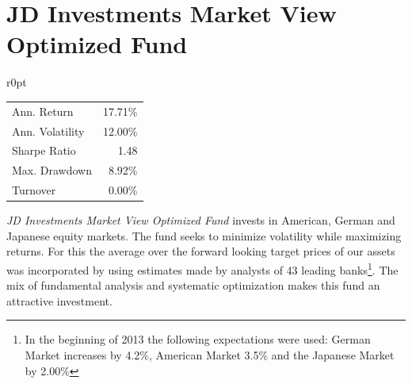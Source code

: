 \documentclass[11pt, parskip=full, DIV=14, headings=small, footsepline, footinclude=false, headsepline]{scrreprt}
\let\oldcenter\center
\let\oldendcenter\endcenter
\renewenvironment{center}{\setlength\topsep{6pt}\oldcenter}{\oldendcenter}
\begin{document}
\newpage\section{JD Investments Market View Optimized Fund}
\begin{mywraptable}{r}{0pt}
\begin{tabular}{lr}
\toprule
Ann. Return & 17.71\%\\
Ann. Volatility & 12.00\%\\
Sharpe Ratio & 1.48\\
Max. Drawdown & 8.92\% \\
Turnover & 0.00\%\\
\bottomrule
\end{tabular}
\end{mywraptable}
\textit{JD Investments Market View Optimized Fund} invests in American, German and Japanese equity markets.
The fund seeks to minimize volatility while maximizing returns.
For this the average over the forward looking target prices of our assets was incorporated by using estimates made by analysts of 43 leading banks\footnote{In the beginning of 2013 the following expectations were used: German Market increases by 4.2\%, American Market 3.5\% and the Japanese Market by 2.00\%}.
The mix of fundamental analysis and systematic optimization makes this fund an attractive investment.


\begin{center}
\end{center}
\end{document}
